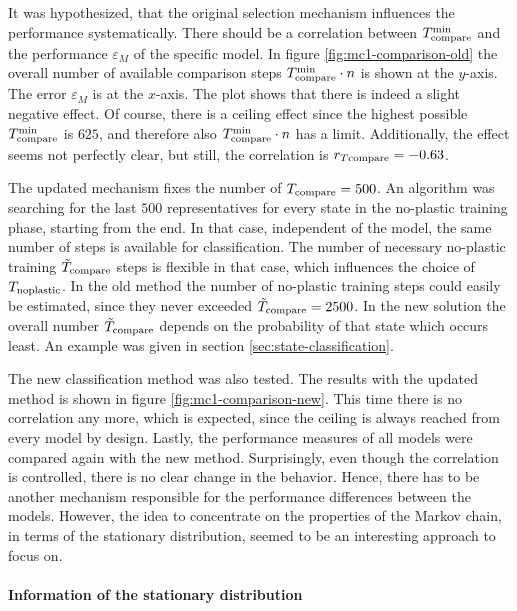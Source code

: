 It was hypothesized, that the original selection mechanism influences the performance systematically. There should be a correlation between $T_{\text{compare}}^{\text{min}}$ and the performance $\varepsilon_M$ of the specific model. In figure \ref{fig:mc1-comparison-old} the overall number of available comparison steps $T_{\text{compare}}^{\text{min}} \cdot n$ is shown at the $y$-axis. The error $\varepsilon_M$ is at the $x$-axis. The plot shows that there is indeed a slight negative effect. Of course, there is a ceiling effect since the highest possible $T_{\text{compare}}^{\text{min}}$ is $625$, and therefore also $T_{\text{compare}}^{\text{min}} \cdot n$ has a limit. Additionally, the effect seems not perfectly clear, but still, the correlation is $r_{T\text{compare}} = -0.63$.

The updated mechanism fixes the number of $T_{\text{compare}} = 500$. An algorithm was searching for the last $500$ representatives for every state in the no-plastic training phase, starting from the end. In that case, independent of the model, the same number of steps is available for classification. The number of necessary no-plastic training $\tilde{T}_{\text{compare}}$ steps is flexible in that case, which influences the choice of $T_{\text{noplastic}}$. In the old method the number of no-plastic training steps could easily be estimated, since they never exceeded $\tilde{T}_{\text{compare}} = 2500$. In the new solution the overall number $\tilde{T}_{\text{compare}}$ depends on the probability of that state which occurs least. An example was given in section \ref{sec:state-classification}.

The new classification method was also tested. The results with the updated method is shown in figure \ref{fig:mc1-comparison-new}. This time there is no correlation any more, which is expected, since the ceiling is always reached from every model by design. Lastly, the performance measures of all models were compared again with the new method. Surprisingly, even though the correlation is controlled, there is no clear change in the behavior. Hence, there has to be another mechanism responsible for the performance differences between the models. However, the idea to concentrate on the properties of the Markov chain, in terms of the stationary distribution, seemed to be an interesting approach to focus on.

\paragraph{Information of the stationary distribution}

